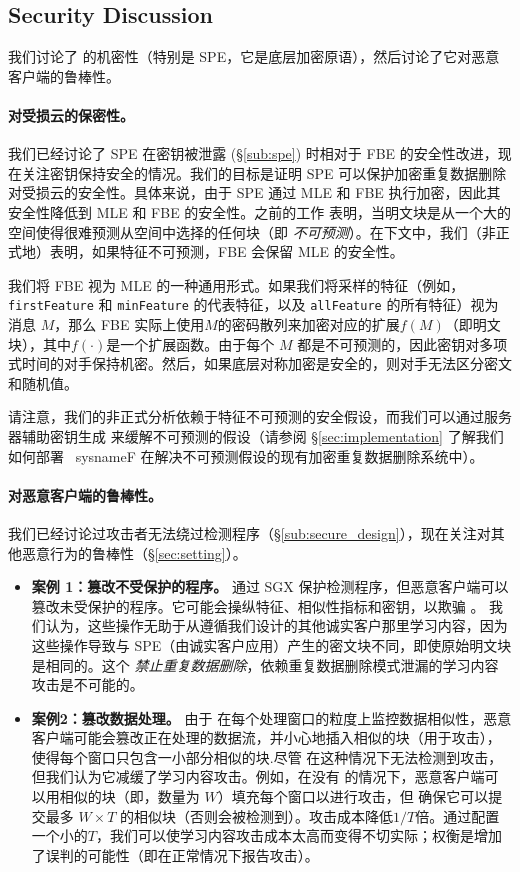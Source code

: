 \subsection{Security Discussion}
\label{sub:security}
我们讨论了 \sysnameF 的机密性（特别是 SPE，它是底层加密原语），然后讨论了它对恶意客户端的鲁棒性。

\paragraph{对受损云的保密性。}
我们已经讨论了 SPE 在密钥被泄露 (\S\ref{sub:spe}) 时相对于 FBE 的安全性改进，现在关注密钥保持安全的情况。我们的目标是证明 SPE 可以保护加密重复数据删除对受损云的安全性。具体来说，由于 SPE 通过 MLE 和 FBE 执行加密，因此其安全性降低到 MLE 和 FBE 的安全性。之前的工作 \cite{bellare13a} 表明，当明文块是从一个大的空间使得很难预测从空间中选择的任何块（即 {\em 不可预测}）。在下文中，我们（非正式地）表明，如果特征不可预测，FBE 会保留 MLE 的安全性。


我们将 FBE 视为 MLE 的一种通用形式。如果我们将采样的特征（例如，{\tt firstFeature} 和 {\tt minFeature} 的代表特征，以及 {\tt allFeature} 的所有特征）视为消息 $M$，那么 FBE 实际上使用$M$的密码散列来加密对应的扩展$f(M)$（即明文块），其中$f(\cdot)$是一个扩展函数。由于每个 $M$ 都是不可预测的，因此密钥对多项式时间的对手保持机密。然后，如果底层对称加密是安全的，则对手无法区分密文和随机值。

请注意，我们的非正式分析依赖于特征不可预测的安全假设，而我们可以通过服务器辅助密钥生成 \cite{bellare13b} 来缓解不可预测的假设（请参阅 \S\ref{sec:implementation} 了解我们如何部署 \ sysnameF 在解决不可预测假设的现有加密重复数据删除系统中）。


\paragraph{对恶意客户端的鲁棒性。}
我们已经讨论过攻击者无法绕过检测程序（\S\ref{sub:secure_design}），现在关注对其他恶意行为的鲁棒性（\S\ref{sec:setting}）。


\begin{itemize}[leftmargin=*]
  \item {\bf 案例 1：篡改不受保护的程序。}
    \sysnameF 通过 SGX 保护检测程序，但恶意客户端可以篡改未受保护的程序。它可能会操纵特征、相似性指标和密钥，以欺骗 \sysnameF。
    我们认为，这些操作无助于从遵循我们设计的其他诚实客户那里学习内容，因为这些操作导致与 SPE（由诚实客户应用）产生的密文块不同，即使原始明文块是相同的。这个 {\em 禁止重复数据删除}，依赖重复数据删除模式泄漏的学习内容攻击是不可能的。
  \item {\bf 案例2：篡改数据处理。}
    由于 \sysnameF 在每个处理窗口的粒度上监控数据相似性，恶意客户端可能会篡改正在处理的数据流，并小心地插入相似的块（用于攻击），使得每个窗口只包含一小部分相似的块.尽管 \sysnameF 在这种情况下无法检测到攻击，但我们认为它减缓了学习内容攻击。例如，在没有 \sysnameF 的情况下，恶意客户端可以用相似的块（即，数量为 $W$）填充每个窗口以进行攻击，但 \sysnameF 确保它可以提交最多 $W\times T$ 的相似块（否则会被检测到）。攻击成本降低$1/T$倍。通过配置一个小的$T$，我们可以使学习内容攻击成本太高而变得不切实际；权衡是增加了误判的可能性（即在正常情况下报告攻击）。
\end{itemize}
  
